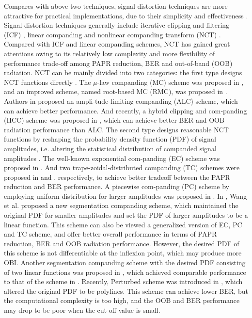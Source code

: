 \documentclass{ccjnl}
\begin{document}
Compares with above two techniques, signal distortion techniques are more attractive for practical implementations, due to their simplicity and effectiveness \cite{5,6}. Signal distortion techniques generally include iterative clipping and filtering (ICF) \cite{10}, linear companding \cite{11,12} and nonlinear companding transform (NCT) \cite{13,14,15,16,17,18,19,20,21,22,23}. Compared with ICF and linear companding schemes, NCT has gained great attentions owing to its relatively low complexity and more flexibility of performance trade-off among PAPR reduction, BER and out-of-band (OOB) radiation. NCT can be mainly divided into two categories: the first type designs NCT functions directly \cite{13,14,15,16}. The $\mu$-law companding (MC) scheme was proposed in \cite{13}, and an improved scheme, named root-based MC (RMC), was proposed in \cite{14}. Authors in \cite{15} proposed an ampli-tude-limiting companding (ALC) scheme, which can achieve better performance. And recently, a hybrid clipping and com-panding (HCC) scheme was proposed in \cite{16}, which can achieve better BER and OOB radiation performance than ALC. The second type designs reasonable NCT functions by reshaping the probability density function (PDF) of signal amplitudes, i.e. altering the statistical distribution of companded signal amplitudes \cite{17,18,19,20,21,22,23}. The well-known exponential com-panding (EC) scheme was proposed in \cite{17}. And two trape-zoidal-distributed companding (TC) schemes were proposed in \cite{18} and \cite{19}, respectively, to achieve better tradeoff between the PAPR reduction and BER performance. A piecewise com-panding (PC) scheme by employing uniform distribution for larger amplitudes was proposed in \cite{20}. In \cite{21}, Wang et al. proposed a new segmentation companding scheme, which maintained the original PDF for smaller amplitudes and set the PDF of larger amplitudes to be a linear function. This scheme can also be viewed a generalized version of EC, PC and TC scheme, and offer better overall performance in terms of PAPR reduction, BER and OOB radiation performance. However, the desired PDF of this scheme is not differentiable at the inflexion point, which may produce more OBI. Another segmentation companding scheme with the desired PDF consisting of two linear functions was proposed in \cite{22}, which achieved comparable performance to that of the scheme in \cite{21}. Recently,  Perturbed scheme was introduced in \cite{23}, which altered the original PDF to be polylines. This scheme can achieve lower BER, but the computational complexity is too high, and the OOB and BER performance may drop to be poor when the cut-off value is small.
\end{document}
